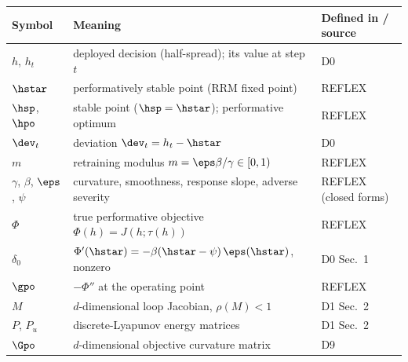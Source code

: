 \begin{center}\small
\begin{tabular}{@{}l>{\raggedright\arraybackslash}p{4.9cm}l@{}}
\hline
Symbol & Meaning & Defined in / source\\
\hline
$h$, $h_t$ & deployed decision (half-spread); its value at
  step $t$ & D0\\
$\hstar$ & performatively stable point (RRM fixed point)
  & REFLEX \citep{reflex2026}\\
$\hsp$, $\hpo$ & stable point ($\hsp = \hstar$); performative
  optimum & REFLEX \citep{reflex2026}\\
$\dev_t$ & deviation $\dev_t = h_t - \hstar$ & D0\\
$m$ & retraining modulus $m = \eps\beta/\gamma \in [0,1)$
  & REFLEX \citep{reflex2026}\\
$\gamma$, $\beta$, $\eps$, $\psi$ & curvature, smoothness,
  response slope, adverse severity & REFLEX \citep{reflex2026} (closed forms)\\
$\Phi$ & true performative objective $\Phi(h) = J(h;\tau(h))$
  & REFLEX \citep{reflex2026}\\
$\delta_0$ & $\Phi'(\hstar) = -\beta(\hstar-\psi)\,\eps(\hstar)$,
  nonzero & D0 Sec.~1\\
$\gpo$ & $-\Phi''$ at the operating point & REFLEX \citep{reflex2026}\\
$M$ & $d$-dimensional loop Jacobian, $\rho(M) < 1$ & D1 Sec.~2\\
$P$, $P_u$ & discrete-Lyapunov energy matrices & D1 Sec.~2\\
$\Gpo$ & $d$-dimensional objective curvature matrix & D9\\
\hline
\end{tabular}
\end{center}


